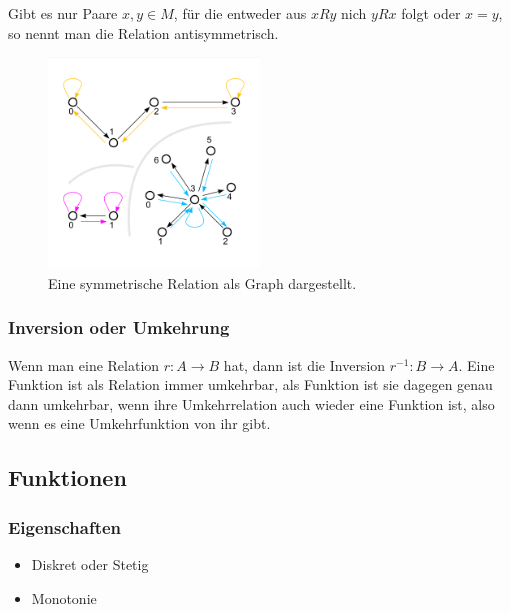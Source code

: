 \documentclass[../main.tex]{subfiles}
\begin{document}
                    Gibt es nur Paare $x, y \in M$, für die entweder aus $xRy$ nich $yRx$ folgt oder $x = y$, so nennt man die Relation antisymmetrisch.
                    
                    
                    \begin{figure}
                         \centering
                         \includegraphics[width=0.5\textwidth]{Abbildungen/Symmetrie_Graph.png}
                         \caption{Eine symmetrische Relation als Graph dargestellt.}
                         \label{figure:Mathematik:FormaleGrundlagen:Symmetrie_Graph}
                    \end{figure}
                    
            \subsubsection{Inversion oder Umkehrung}
                Wenn man eine Relation $r\colon A \rightarrow B$ hat, dann ist die Inversion $r^{-1}\colon B \rightarrow A$. Eine Funktion ist als Relation immer umkehrbar, als Funktion ist sie dagegen genau dann umkehrbar, wenn ihre Umkehrrelation auch wieder eine Funktion ist, also wenn es eine Umkehrfunktion von ihr gibt.                
                    
                    
        \subsection{Funktionen}
            \subsubsection{Eigenschaften}
                \begin{itemize}
                    \item Diskret oder Stetig
                    \item Monotonie
                \end{itemize}
                
\end{document}
